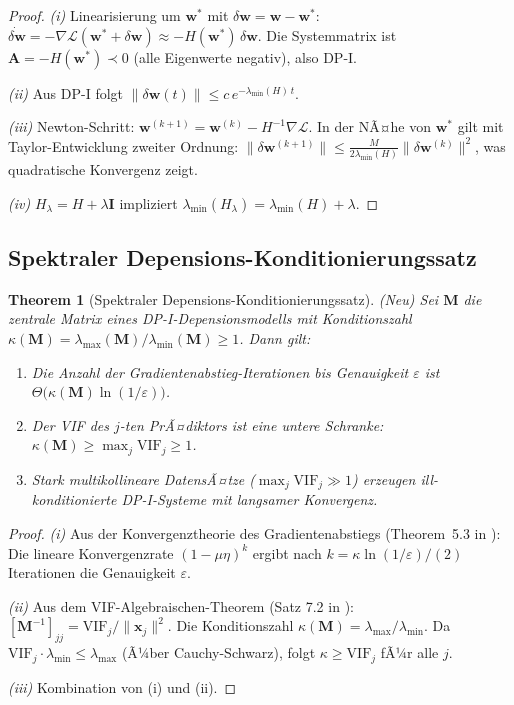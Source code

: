 ﻿\documentclass[12pt, a4paper]{article}
\newtheorem{theorem}{Theorem}[section]
\theoremstyle{definition}
\theoremstyle{remark}
\newcommand{\vw}{\bm{w}}
\newcommand{\vx}{\bm{x}}
\newcommand{\vA}{\bm{A}}
\newcommand{\vI}{\bm{I}}
\newcommand{\VIF}{\mathrm{VIF}}
\begin{document}
\begin{proof}
  \textit{(i)} Linearisierung um $\vw^*$ mit $\delta\vw = \vw - \vw^*$:
  $\dot{\delta\vw} = -\nabla\mathcal{L}(\vw^* + \delta\vw) \approx -H(\vw^*)\,\delta\vw$.
  Die Systemmatrix ist $\vA = -H(\vw^*) \prec 0$ (alle Eigenwerte negativ), also DP-I.

  \textit{(ii)} Aus DP-I folgt $\|\delta\vw(t)\| \leq c\,e^{-\lambda_{\min}(H)\,t}$.

  \textit{(iii)} Newton-Schritt: $\vw^{(k+1)} = \vw^{(k)} - H^{-1}\nabla\mathcal{L}$.
  In der NÃ¤he von $\vw^*$ gilt mit Taylor-Entwicklung zweiter Ordnung:
  $\|\delta\vw^{(k+1)}\| \leq \frac{M}{2\lambda_{\min}(H)}\|\delta\vw^{(k)}\|^2$,
  was quadratische Konvergenz zeigt.

  \textit{(iv)} $H_\lambda = H + \lambda\vI$ impliziert
  $\lambda_{\min}(H_\lambda) = \lambda_{\min}(H) + \lambda$. \qedhere
\end{proof}

\subsection{Spektraler Depensions-Konditionierungssatz}

\begin{theorem}[Spektraler Depensions-Konditionierungssatz]
\label{thm:konditionierung}
\textup{(Neu)} Sei $\mathbf{M}$ die zentrale Matrix eines DP-I-Depensionsmodells
mit Konditionszahl
$\kappa(\mathbf{M}) = \lambda_{\max}(\mathbf{M}) / \lambda_{\min}(\mathbf{M}) \geq 1$.
Dann gilt:
\begin{enumerate}[label=(\roman*)]
  \item Die Anzahl der Gradientenabstieg-Iterationen bis Genauigkeit
    $\varepsilon$ ist $\Theta\bigl(\kappa(\mathbf{M}) \ln(1/\varepsilon)\bigr)$.
  \item Der VIF des $j$-ten PrÃ¤diktors ist eine untere Schranke:
    $\kappa(\mathbf{M}) \geq \max_j \VIF_j \geq 1$.
  \item Stark multikollineare DatensÃ¤tze ($\max_j \VIF_j \gg 1$) erzeugen
    ill-konditionierte DP-I-Systeme mit langsamer Konvergenz.
\end{enumerate}
\end{theorem}

\begin{proof}
  \textit{(i)} Aus der Konvergenztheorie des Gradientenabstiegs (Theorem~5.3 in
  \citealt{epp2026logreg}): Die lineare Konvergenzrate $(1-\mu\eta)^k$ ergibt nach
  $k = \kappa\ln(1/\varepsilon)/(2)$ Iterationen die Genauigkeit $\varepsilon$.

  \textit{(ii)} Aus dem VIF-Algebraischen-Theorem (Satz 7.2 in \citealt{epp2026logreg}):
  $[\mathbf{M}^{-1}]_{jj} = \VIF_j / \|\vx_j\|^2$. Die Konditionszahl
  $\kappa(\mathbf{M}) = \lambda_{\max}/\lambda_{\min}$. Da $\VIF_j \cdot \lambda_{\min}
  \leq \lambda_{\max}$ (Ã¼ber Cauchy-Schwarz), folgt $\kappa \geq \VIF_j$ fÃ¼r alle $j$.

  \textit{(iii)} Kombination von (i) und (ii). \qedhere
\end{proof}
\end{document}
